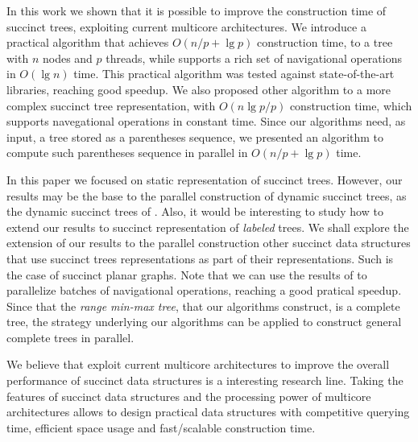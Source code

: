 In this work we shown that it is possible to improve the construction time of succinct
trees, exploiting current multicore architectures. We introduce a practical algorithm that
achieves $O(n/p+\lg p)$ construction time, to a tree with $n$ nodes and $p$
threads, while supports a rich set of navigational operations in $O(\lg n)$ time. This
practical algorithm was tested against state-of-the-art libraries, reaching good speedup.
We also proposed other algorithm to a more complex succinct tree representation, with
$O(n\lg p/p)$ construction time, which supports navegational operations in
constant time. Since our algorithms need, as input, a tree stored as a parentheses
sequence, we presented an algorithm to compute such parentheses sequence in parallel in
$O(n/p+\lg p)$ time.

In this paper we focused on static representation of succinct trees. However, our results
may be the base to the parallel construction of dynamic succinct trees, as the dynamic
succinct trees of \cite{Navarro:2014:FFS:2620785.2601073}. Also, it would be interesting
to study how to extend our results to succinct representation of \emph{labeled} trees. We
shall explore the extension of our results to the parallel construction other succinct
data structures that use succinct trees representations as part of their representations.
Such is the case of succinct planar graphs. Note that we can use the results of
\cite{Fuentes2014} to parallelize batches of navigational operations, reaching a good
pratical speedup. Since that the \emph{range min-max tree}, that our algorithms construct,
is a complete tree, the strategy underlying our algorithms can be applied to construct
general complete trees in parallel.

We believe that exploit current multicore architectures to improve the overall performance
of succinct data structures is a interesting research line. Taking the features of
succinct data structures and the processing power of multicore architectures allows to
design practical data structures with competitive querying time, efficient space usage and
fast/scalable construction time.